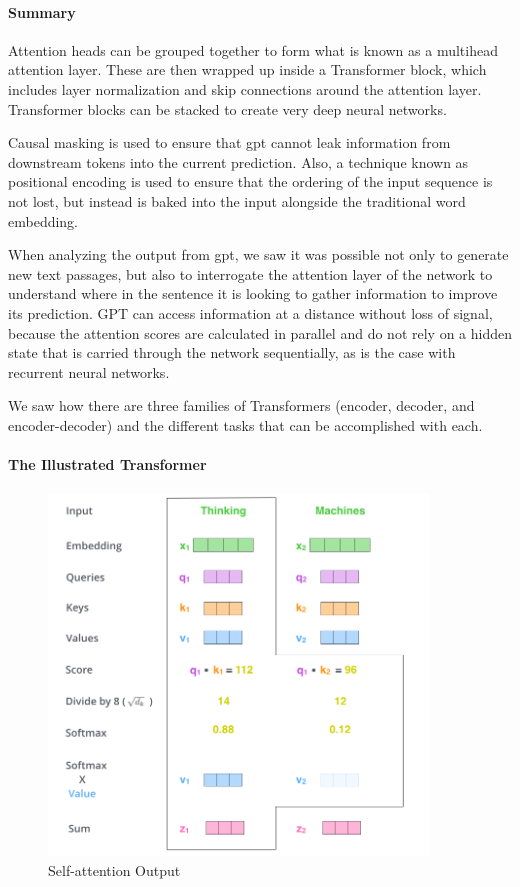 \paragraph{Summary}

Attention heads can be grouped together to form what is known as a multihead attention layer.
These are then wrapped up inside a Transformer block, which includes layer normalization and skip connections around the attention layer.
Transformer blocks can be stacked to create very deep neural networks.

Causal masking is used to ensure that \gls{gpt} cannot leak information from downstream tokens into the current prediction.
Also, a technique known as positional encoding is used to ensure that the ordering of the input sequence is not lost, but instead is baked into the input alongside the traditional word embedding.

When analyzing the output from \gls{gpt}, we saw it was possible not only to generate new text passages, but also to interrogate the attention layer of the network to understand where in the sentence it is looking to gather information to improve its prediction.
GPT can access information at a distance without loss of signal, because the attention scores are calculated in parallel and do not rely on a hidden state that is carried through the network sequentially, as is the case with recurrent neural networks.

We saw how there are three families of Transformers (encoder, decoder, and encoder-decoder) and the different tasks that can be accomplished with each.

\paragraph{The Illustrated Transformer~\cite{alammar2018illustrated}}

\begin{figure}
	\begin{center}
		\includegraphics[width=0.9\textwidth]{figures/self-attention-output}
	\end{center}
	\caption{Self-attention Output}\label{fig:self-attention-output}
\end{figure}


